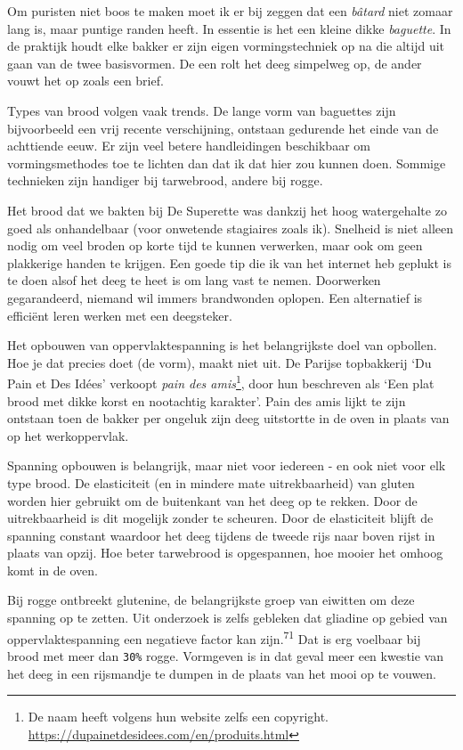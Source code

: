 \documentclass[
  11pt,
  dutch,
]{memoir}
\begin{document}
Om puristen niet boos te maken moet ik er bij zeggen dat een
\emph{bâtard} niet zomaar lang is, maar puntige randen heeft. In
essentie is het een kleine dikke \emph{baguette}. In de praktijk houdt
elke bakker er zijn eigen vormingstechniek op na die altijd uit gaan van
de twee basisvormen. De een rolt het deeg simpelweg op, de ander vouwt
het op zoals een brief.

Types van brood volgen vaak trends. De lange vorm van baguettes zijn
bijvoorbeeld een vrij recente verschijning, ontstaan gedurende het einde
van de achttiende eeuw. Er zijn veel betere handleidingen beschikbaar om
vormingsmethodes toe te lichten dan dat ik dat hier zou kunnen doen.
Sommige technieken zijn handiger bij tarwebrood, andere bij rogge.

Het brood dat we bakten bij De Superette was dankzij het hoog
watergehalte zo goed als onhandelbaar (voor onwetende stagiaires zoals
ik). Snelheid is niet alleen nodig om veel broden op korte tijd te
kunnen verwerken, maar ook om geen plakkerige handen te krijgen. Een
goede tip die ik van het internet heb geplukt is te doen alsof het deeg
te heet is om lang vast te nemen. Doorwerken gegarandeerd, niemand wil
immers brandwonden oplopen. Een alternatief is efficiënt leren werken
met een deegsteker.

Het opbouwen van oppervlaktespanning is het belangrijkste doel van
opbollen. Hoe je dat precies doet (de vorm), maakt niet uit. De Parijse
topbakkerij `Du Pain et Des Idées' verkoopt \emph{pain des
amis}\footnote{De naam heeft volgens hun website zelfs een copyright.
  \url{https://dupainetdesidees.com/en/produits.html}}, door hun
beschreven als `Een plat brood met dikke korst en nootachtig karakter'.
Pain des amis lijkt te zijn ontstaan toen de bakker per ongeluk zijn
deeg uitstortte in de oven in plaats van op het werkoppervlak.

Spanning opbouwen is belangrijk, maar niet voor iedereen - en ook niet
voor elk type brood. De elasticiteit (en in mindere mate uitrekbaarheid)
van gluten worden hier gebruikt om de buitenkant van het deeg op te
rekken. Door de uitrekbaarheid is dit mogelijk zonder te scheuren. Door
de elasticiteit blijft de spanning constant waardoor het deeg tijdens de
tweede rijs naar boven rijst in plaats van opzij. Hoe beter tarwebrood
is opgespannen, hoe mooier het omhoog komt in de oven.

Bij rogge ontbreekt glutenine, de belangrijkste groep van eiwitten om
deze spanning op te zetten. Uit onderzoek is zelfs gebleken dat gliadine
op gebied van oppervlaktespanning een negatieve factor kan
zijn.\textsuperscript{71} Dat is erg voelbaar bij brood met meer dan
\texttt{30\%} rogge. Vormgeven is in dat geval meer een kwestie van het
deeg in een rijsmandje te dumpen in de plaats van het mooi op te vouwen.
\end{document}
